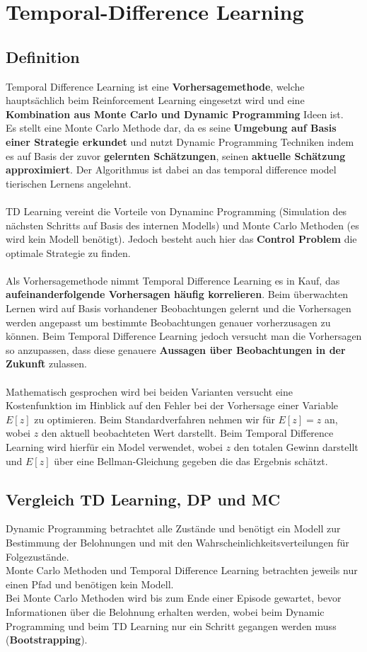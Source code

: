 \documentclass[10pt]{scrartcl}
\begin{document}
\section{Temporal-Difference Learning}
\subsection{Definition}
Temporal Difference Learning ist eine \textbf{Vorhersagemethode}, welche hauptsächlich beim Reinforcement Learning eingesetzt wird und eine \textbf{Kombination aus Monte Carlo und Dynamic Programming} Ideen ist.\\
Es stellt eine Monte Carlo Methode dar, da es seine \textbf{Umgebung auf Basis einer Strategie erkundet} und nutzt Dynamic Programming Techniken indem es auf Basis der zuvor \textbf{gelernten Schätzungen}, seinen \textbf{aktuelle Schätzung approximiert}. Der Algorithmus ist dabei an das \glqq temporal difference model\grqq\xspace tierischen Lernens angelehnt.\\
\\
TD Learning vereint die Vorteile von Dynaminc Programming (Simulation des nächsten Schritts auf Basis des internen Modells) und Monte Carlo Methoden (es wird kein Modell benötigt). Jedoch besteht auch hier das \textbf{Control Problem} die optimale Strategie zu finden.\\
\\
Als Vorhersagemethode nimmt Temporal Difference Learning es in Kauf, das \textbf{aufeinanderfolgende Vorhersagen häufig korrelieren}. Beim überwachten Lernen wird auf Basis vorhandener Beobachtungen gelernt und die Vorhersagen werden angepasst um bestimmte Beobachtungen genauer vorherzusagen zu können. Beim Temporal Difference Learning jedoch versucht man die Vorhersagen so anzupassen, dass diese genauere \textbf{Aussagen über Beobachtungen in der Zukunft} zulassen.\\
\\
Mathematisch gesprochen wird bei beiden Varianten versucht eine Kostenfunktion im Hinblick auf den Fehler bei der Vorhersage einer Variable $E[z]$ zu optimieren. Beim Standardverfahren nehmen wir für $E[z]=z$ an, wobei $z$ den aktuell beobachteten Wert darstellt. Beim Temporal Difference Learning wird hierfür ein Model verwendet, wobei $z$ den totalen Gewinn darstellt und $E[z]$ über eine Bellman-Gleichung gegeben die das Ergebnis schätzt.

\subsection{Vergleich TD Learning, DP und MC}
Dynamic Programming betrachtet alle Zustände und benötigt ein Modell zur Bestimmung der Belohnungen und mit den Wahrscheinlichkeitsverteilungen für Folgezustände.\\
Monte Carlo Methoden und Temporal Difference Learning betrachten jeweils nur einen Pfad und benötigen kein Modell.\\
Bei Monte Carlo Methoden wird bis zum Ende einer Episode gewartet, bevor Informationen über die Belohnung erhalten werden, wobei beim Dynamic Programming und beim TD Learning nur ein Schritt gegangen werden muss (\textbf{Bootstrapping}).
\end{document}

